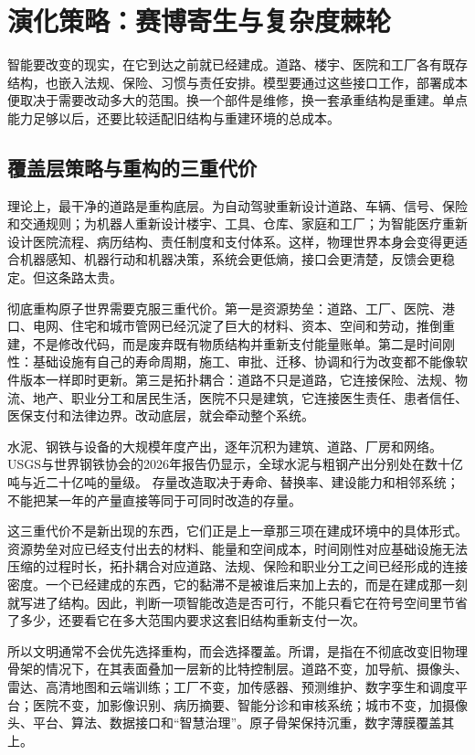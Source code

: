 \section{演化策略：赛博寄生与复杂度棘轮}

智能要改变的现实，在它到达之前就已经建成。道路、楼宇、医院和工厂各有既存结构，也嵌入法规、保险、习惯与责任安排。模型要通过这些接口工作，部署成本便取决于需要改动多大的范围。换一个部件是维修，换一套承重结构是重建。单点能力足够以后，还要比较适配旧结构与重建环境的总成本。

\subsection{覆盖层策略与重构的三重代价}


理论上，最干净的道路是重构底层。为自动驾驶重新设计道路、车辆、信号、保险和交通规则；为机器人重新设计楼宇、工具、仓库、家庭和工厂；为智能医疗重新设计医院流程、病历结构、责任制度和支付体系。这样，物理世界本身会变得更适合机器感知、机器行动和机器决策，系统会更低熵，接口会更清楚，反馈会更稳定。但这条路太贵。

彻底重构原子世界需要克服三重代价。第一是资源势垒：道路、工厂、医院、港口、电网、住宅和城市管网已经沉淀了巨大的材料、资本、空间和劳动，推倒重建，不是修改代码，而是废弃既有物质结构并重新支付能量账单。第二是时间刚性：基础设施有自己的寿命周期，施工、审批、迁移、协调和行为改变都不能像软件版本一样即时更新。第三是拓扑耦合：道路不只是道路，它连接保险、法规、物流、地产、职业分工和居民生活，医院不只是建筑，它连接医生责任、患者信任、医保支付和法律边界。改动底层，就会牵动整个系统。

水泥、钢铁与设备的大规模年度产出，逐年沉积为建筑、道路、厂房和网络。USGS与世界钢铁协会的2026年报告仍显示，全球水泥与粗钢产出分别处在数十亿吨与近二十亿吨的量级。\cite{usgs2026cement,worldsteel2026figures} 存量改造取决于寿命、替换率、建设能力和相邻系统；不能把某一年的产量直接等同于可同时改造的存量。

这三重代价不是新出现的东西，它们正是上一章那三项在建成环境中的具体形式。资源势垒对应已经支付出去的材料、能量和空间成本，时间刚性对应基础设施无法压缩的过程时长，拓扑耦合对应道路、法规、保险和职业分工之间已经形成的连接密度。一个已经建成的东西，它的黏滞不是被谁后来加上去的，而是在建成那一刻就写进了结构。因此，判断一项智能改造是否可行，不能只看它在符号空间里节省了多少，还要看它在多大范围内要求这套旧结构重新支付一次。


所以文明通常不会优先选择重构，而会选择覆盖。所谓，是指在不彻底改变旧物理骨架的情况下，在其表面叠加一层新的比特控制层。道路不变，加导航、摄像头、雷达、高清地图和云端训练；工厂不变，加传感器、预测维护、数字孪生和调度平台；医院不变，加影像识别、病历摘要、智能分诊和审核系统；城市不变，加摄像头、平台、算法、数据接口和“智慧治理”。原子骨架保持沉重，数字薄膜覆盖其上。

